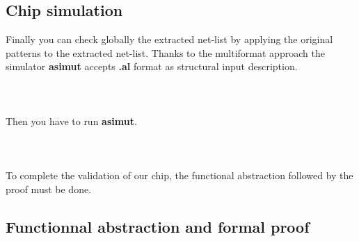 \documentclass[11pt,a4]{article}
\begin{document}
\subsection{Chip simulation}

Finally you can check globally the extracted net-list
by applying the original patterns to the extracted net-list.
Thanks to the multiformat approach the simulator {\bf asimut}
accepts {\bf .al} format as structural input description.\\
\\
\\
\\
Then you have to run {\bf asimut}.\\
\\
\\
\\
To complete the validation of our chip, the functional abstraction followed
by the proof must be done.

\subsection{Functionnal abstraction and formal proof}
\end{document}
